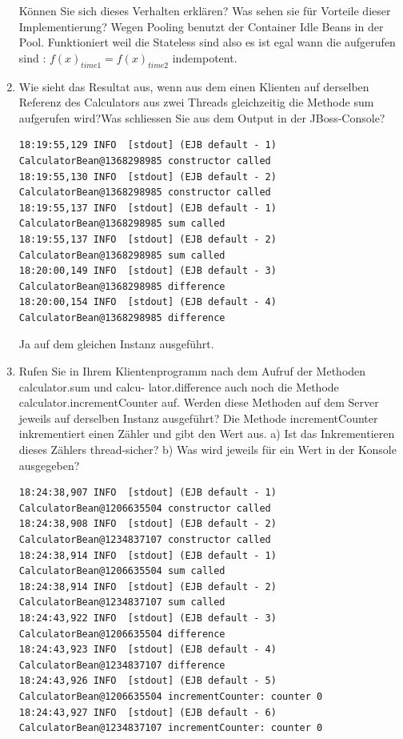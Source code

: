 \documentclass[a4paper,10pt]{scrreprt}
\begin{document}
\begin{enumerate}
\begin{lstlisting}[language={}]
\end{lstlisting}


Können Sie sich dieses Verhalten erklären? Was sehen sie für Vorteile dieser Implementierung?
{\color{red} Wegen Pooling  benutzt der Container Idle Beans in der Pool. Funktioniert weil die Stateless sind also es 
ist egal wann die aufgerufen sind : $ f(x)_{time1} = f(x)_{time2}$ indempotent. }
\item Wie sieht das Resultat aus, wenn aus dem einen Klienten auf derselben Referenz des Calculators
aus zwei Threads gleichzeitig die Methode sum aufgerufen wird?Was schliessen Sie aus dem Output in der JBoss-Console?
\begin{lstlisting}[language={}]
 18:19:55,129 INFO  [stdout] (EJB default - 1) CalculatorBean@1368298985 constructor called
18:19:55,130 INFO  [stdout] (EJB default - 2) CalculatorBean@1368298985 constructor called
18:19:55,137 INFO  [stdout] (EJB default - 1) CalculatorBean@1368298985 sum called
18:19:55,137 INFO  [stdout] (EJB default - 2) CalculatorBean@1368298985 sum called
18:20:00,149 INFO  [stdout] (EJB default - 3) CalculatorBean@1368298985 difference
18:20:00,154 INFO  [stdout] (EJB default - 4) CalculatorBean@1368298985 difference

\end{lstlisting}
{\color{red} Ja auf dem gleichen Instanz ausgeführt.}
\item Rufen Sie in Ihrem Klientenprogramm nach dem Aufruf der Methoden calculator.sum und calcu-
lator.difference auch noch die Methode calculator.incrementCounter auf.
Werden diese Methoden auf dem Server jeweils auf derselben Instanz ausgeführt?
Die Methode incrementCounter inkrementiert einen Zähler und gibt den Wert aus.
a) Ist das Inkrementieren dieses Zählers thread-sicher?
b) Was wird jeweils für ein Wert in der Konsole ausgegeben?
\begin{lstlisting}[language={}]
 18:24:38,907 INFO  [stdout] (EJB default - 1) CalculatorBean@1206635504 constructor called
18:24:38,908 INFO  [stdout] (EJB default - 2) CalculatorBean@1234837107 constructor called
18:24:38,914 INFO  [stdout] (EJB default - 1) CalculatorBean@1206635504 sum called
18:24:38,914 INFO  [stdout] (EJB default - 2) CalculatorBean@1234837107 sum called
18:24:43,922 INFO  [stdout] (EJB default - 3) CalculatorBean@1206635504 difference
18:24:43,923 INFO  [stdout] (EJB default - 4) CalculatorBean@1234837107 difference
18:24:43,926 INFO  [stdout] (EJB default - 5) CalculatorBean@1206635504 incrementCounter: counter 0
18:24:43,927 INFO  [stdout] (EJB default - 6) CalculatorBean@1234837107 incrementCounter: counter 0


\end{lstlisting}
\end{enumerate}
\end{document}

